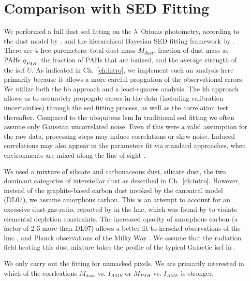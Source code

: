         \section{Comparison with SED Fitting}
          We performed a full dust \gls{sed} fitting on the $\lambda$~Orionis photometry, according to the dust model by \cite{galliano11}, and the hierarchical Bayesian SED fitting framework by \cite{galliano18}. There are 4 free paremeters: total dust mass $M_{dust}$, fraction of dust mass as PAHs $q_{PAH}$, the fraction of PAHs that are ionized, and the average strength of the \gls{isrf} $U$. As indicated in Ch.~\ref{ch:intro}, we implement such an analysis here primarily because it allows a more careful propgation of the observational errors. We utilize both the \gls{hb} approach and a least-squares analysis. The \gls{hb} approach allows us to accurately propogate errors in the data (including calibration uncertainties) through the \gls{sed} fitting process, as well as the correlation test thereafter. Compared to the ubiquitous \gls{lsm} In traditional \gls{sed} fitting we often assume only Gaussian uncorrelated noise. Even if this were a valid assumption for the raw data, processing steps may induce correlations or skew noise. Induced correlations may also appear in the parameters fit via standard approaches, when environments are mixed along the line-of-sight \citep{shetty09}.

         We used a mixture of silicate and carbonaceous dust, silicate dust, the two dominant categories of interstellar dust as described in Ch.~\ref{ch:intro}. However, instead of the graphite-based carbon dust invoked by the canonical \cite{draine07} model (DL07), we assume amorphous carbon. This is an attempt to account for an excessive dust-gas-ratio, reported by \cite{israel10, bot10} in the \gls{lmc}, which was found by \cite{galliano11} to violate elemental depletion constraints. The increased opacity of amorphous carbon (a factor of 2-3 more than DL07) allows a better fit to \gls{herschel} observations of the \gls{lmc} \citep{galliano11}, and Planck observations of the Milky Way \citep{planckIntXXIX16}. We assume that the radiation field heating this dust mixture takes the profile of the typical Galactic \gls{isrf} in \cite{mathis83}.

          We only carry out the fitting for unmasked pixels. We are primarily interested in which of the corrleations $M_{dust}$ vs. $I_{AME}$ or $M_{PAH}$ vs. $I_{AME}$ is stronger.

